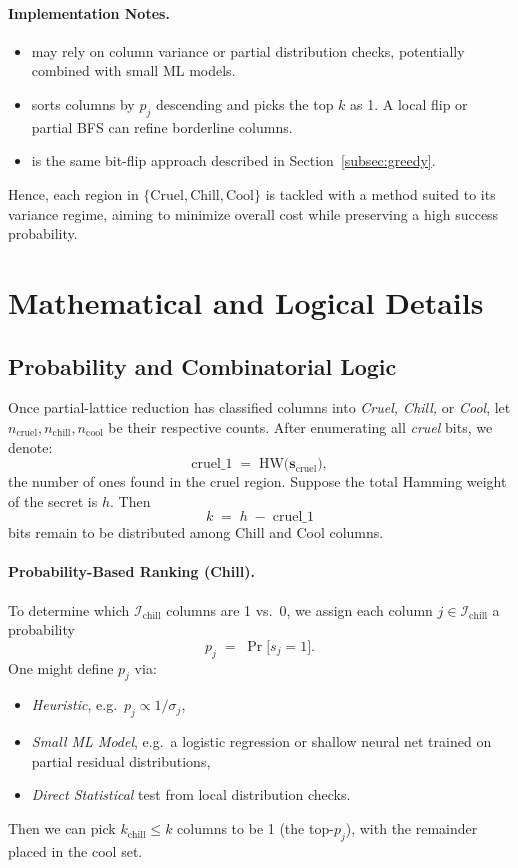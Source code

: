 \documentclass[11pt]{article}
\begin{document}
\paragraph{Implementation Notes.}
\begin{itemize}
\item {} may rely on column variance or partial distribution checks, potentially combined with small ML models.
\item {} sorts columns by $p_j$ descending and picks the top $k$ as 1. A local flip or partial BFS can refine borderline columns.
\item {} is the same bit-flip approach described in Section~\ref{subsec:greedy}. 
\end{itemize}

Hence, each region in $\{\mathrm{Cruel, Chill, Cool}\}$ is tackled with a method suited to its variance regime, aiming to minimize overall cost while preserving a high success probability.

\section{Mathematical and Logical Details}
\label{sec:math-logic}

\subsection{Probability and Combinatorial Logic}
\label{subsec:prob-comb}

Once partial-lattice reduction has classified columns into \emph{Cruel, Chill,} or \emph{Cool}, let 
$n_{\mathrm{cruel}}, n_{\mathrm{chill}}, n_{\mathrm{cool}}$ be their respective counts. After enumerating all \emph{cruel} bits, we denote:
\[
  \mathrm{cruel\_1} \;=\; \mathrm{HW}\bigl(\mathbf{s}_{\mathrm{cruel}}\bigr),
\]
the number of ones found in the cruel region. Suppose the total Hamming weight of the secret is $h$. Then 
\[
  k \;=\; h \;-\; \mathrm{cruel\_1}
\]
bits remain to be distributed among Chill and Cool columns.

\paragraph{Probability-Based Ranking (Chill).}  
To determine which $\mathcal{I}_{\mathrm{chill}}$ columns are 1 vs.\ 0, we assign each column $j \in \mathcal{I}_{\mathrm{chill}}$ a probability 
\[
  p_j \;=\; \Pr\bigl[s_j = 1\bigr].
\]
One might define $p_j$ via:
\begin{itemize}
  \item \emph{Heuristic}, e.g.\ $p_j \propto 1 / \sigma_j$,
  \item \emph{Small ML Model}, e.g.\ a logistic regression or shallow neural net trained on partial residual distributions,
  \item \emph{Direct Statistical} test from local distribution checks.
\end{itemize}
Then we can pick $k_{\mathrm{chill}} \le k$ columns to be 1 (the top-$p_j$), with the remainder placed in the cool set.
\end{document}
